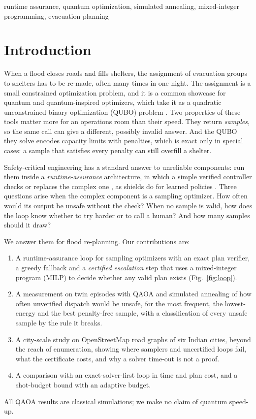 \documentclass[conference]{IEEEtran}
\begin{document}
\begin{IEEEkeywords}
runtime assurance, quantum optimization, simulated annealing, mixed-integer programming, evacuation planning
\end{IEEEkeywords}

\section{Introduction}
When a flood closes roads and fills shelters, the assignment of evacuation groups to shelters has to be re-made, often many times in one night. The assignment is a small constrained optimization problem, and it is a common showcase for quantum and quantum-inspired optimizers, which take it as a quadratic unconstrained binary optimization (QUBO) problem \cite{Lucas2014,Glover2019,Cadelina2024,Abbas2024}. Two properties of these tools matter more for an operations room than their speed. They return \emph{samples}, so the same call can give a different, possibly invalid answer. And the QUBO they solve encodes capacity limits with penalties, which is exact only in special cases: a sample that satisfies every penalty can still overfill a shelter.

Safety-critical engineering has a standard answer to unreliable components: run them inside a \emph{runtime-assurance} architecture, in which a simple verified controller checks or replaces the complex one \cite{Sha2001,Desai2019}, as shields do for learned policies \cite{Alshiekh2018}. Three questions arise when the complex component is a sampling optimizer. How often would its output be unsafe without the check? When no sample is valid, how does the loop know whether to try harder or to call a human? And how many samples should it draw?

We answer them for flood re-planning. Our contributions are:
\begin{enumerate}
\item A runtime-assurance loop for sampling optimizers with an exact plan verifier, a greedy fallback and a \emph{certified escalation} step that uses a mixed-integer program (MILP) to decide whether any valid plan exists (Fig.~\ref{fig:loop}).
\item A measurement on twin episodes with QAOA \cite{Farhi2014,Hadfield2019} and simulated annealing \cite{Kirkpatrick1983} of how often unverified dispatch would be unsafe, for the most frequent, the lowest-energy and the best penalty-free sample, with a classification of every unsafe sample by the rule it breaks.
\item A city-scale study on OpenStreetMap road graphs of six Indian cities, beyond the reach of enumeration, showing where samplers and uncertified loops fail, what the certificate costs, and why a solver time-out is not a proof.
\item A comparison with an exact-solver-first loop in time and plan cost, and a shot-budget bound with an adaptive budget.
\end{enumerate}
All QAOA results are classical simulations; we make no claim of quantum speed-up.
\end{document}
